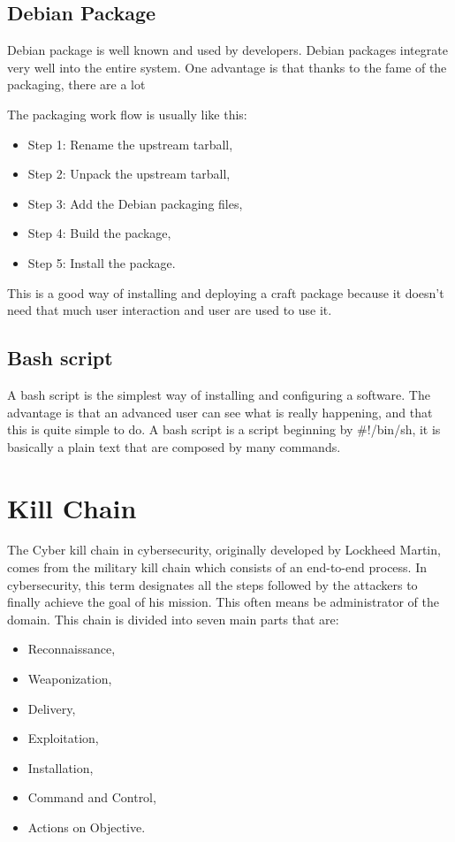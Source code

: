 \documentclass{tnreport}
\begin{document}
\subsection{Debian Package}
Debian package is well known and used by developers. Debian packages integrate very well into the entire system.
One advantage is that thanks to the fame of the packaging, there are a lot 

The packaging work flow is usually like this:

\begin{itemize}
    \item Step 1: Rename the upstream tarball,
    \item Step 2: Unpack the upstream tarball,
    \item Step 3: Add the Debian packaging files,
    \item Step 4: Build the package,
    \item Step 5: Install the package. 
\end{itemize}

This is a good way of installing and deploying a craft package because it doesn't need that much user interaction and user are used to use it.

\subsection{Bash script}
A bash script is the simplest way of installing and configuring a software. The advantage is that an advanced user can see what is really happening, and that this is quite simple to do.
A bash script is a script beginning by \#!/bin/sh, it is basically a plain text that are composed by many commands.

\section{Kill Chain}
The Cyber kill chain in cybersecurity, originally developed by Lockheed Martin\cite{lib25}, comes from the military kill chain which consists of an end-to-end process. In cybersecurity, this term designates all the steps followed by the attackers to finally achieve the goal of his mission. This often means be administrator of the domain. This chain is divided into seven main parts that are: 
\begin{itemize}
    \item Reconnaissance,
    \item Weaponization,
    \item Delivery,
    \item Exploitation,
    \item Installation,
    \item Command and Control,
    \item Actions on Objective.
\end{itemize}
\end{document}
